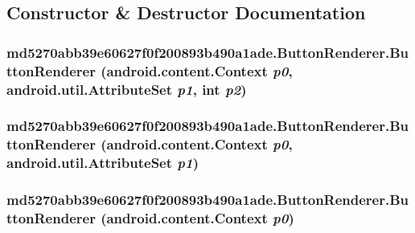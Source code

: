 \subsection{Constructor \& Destructor Documentation}
\hypertarget{classmd5270abb39e60627f0f200893b490a1ade_1_1_button_renderer_69de53fe1b8c1bd7f640db6eef322fdd}{
\subsubsection[{ButtonRenderer}]{\setlength{\rightskip}{0pt plus 5cm}md5270abb39e60627f0f200893b490a1ade.ButtonRenderer.ButtonRenderer (android.content.Context {\em p0}, \/  android.util.AttributeSet {\em p1}, \/  int {\em p2})}}
\label{classmd5270abb39e60627f0f200893b490a1ade_1_1_button_renderer_69de53fe1b8c1bd7f640db6eef322fdd}


\hypertarget{classmd5270abb39e60627f0f200893b490a1ade_1_1_button_renderer_032b2a49be9b19da3e846d539da04e80}{
\subsubsection[{ButtonRenderer}]{\setlength{\rightskip}{0pt plus 5cm}md5270abb39e60627f0f200893b490a1ade.ButtonRenderer.ButtonRenderer (android.content.Context {\em p0}, \/  android.util.AttributeSet {\em p1})}}
\label{classmd5270abb39e60627f0f200893b490a1ade_1_1_button_renderer_032b2a49be9b19da3e846d539da04e80}


\hypertarget{classmd5270abb39e60627f0f200893b490a1ade_1_1_button_renderer_ca79f33076eb791b82fb74d4075b5805}{
\subsubsection[{ButtonRenderer}]{\setlength{\rightskip}{0pt plus 5cm}md5270abb39e60627f0f200893b490a1ade.ButtonRenderer.ButtonRenderer (android.content.Context {\em p0})}}
\label{classmd5270abb39e60627f0f200893b490a1ade_1_1_button_renderer_ca79f33076eb791b82fb74d4075b5805}




